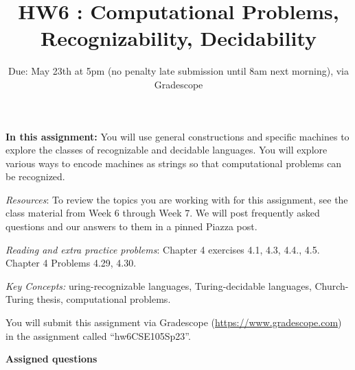

\title{HW6 : Computational Problems, Recognizability, Decidability}
\date{Due: May 23th at 5pm (no penalty late submission until 8am next morning), via Gradescope}


\maketitle
\thispagestyle{fancy}

\textbf{In this assignment:} You will use general constructions and specific machines 
to explore the classes of recognizable and decidable languages. You will explore various 
ways to encode machines as strings so that computational problems can be recognized.

\textit{Resources}:  To review the topics you are working with for this assignment, 
see the class material from Week 6 through Week 7. We will post frequently asked questions 
and our answers to them in a pinned Piazza post.

\textit{Reading and extra practice problems}: Chapter 4 exercises 4.1, 4.3, 4.4., 4.5. 
Chapter 4 Problems 4.29, 4.30.

\textit{Key Concepts:} uring-recognizable languages, Turing-decidable languages, 
Church-Turing thesis, computational problems.

\instructions

You will submit this assignment via Gradescope
(\href{https://www.gradescope.com}{https://www.gradescope.com}) 
in the assignment called ``hw6CSE105Sp23''.

\textbf{Assigned questions}

